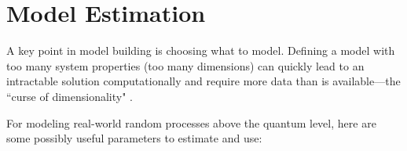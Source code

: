 \chapter{Model Estimation}
\label{chp:model_estimation}
A key point in model building is choosing what to model.
Defining a model with too many system properties (too many dimensions) can quickly lead to 
an intractable solution computationally and require more data than is 
available---the ``curse of dimensionality" .

For modeling real-world random processes above the quantum level, here are some possibly useful parameters to estimate and use:
